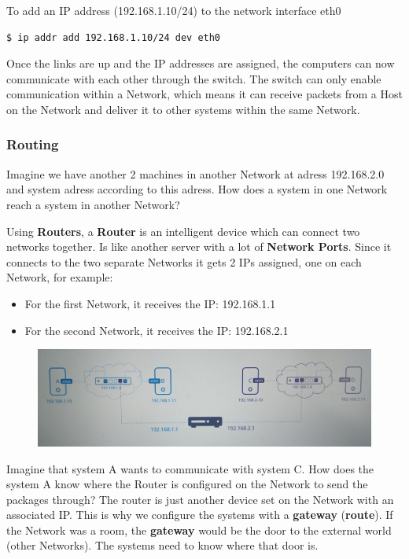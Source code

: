 \documentclass{article}
\newenvironment{codetemplate}[1][]{%
  \mybasecolorbox[#1]
  \itshape
}{%
  \endmybasecolorbox
}
\begin{document}
To add an IP address (192.168.1.10/24) to the network interface eth0
\begin{codetemplate}{}
\begin{verbatim}
$ ip addr add 192.168.1.10/24 dev eth0
\end{verbatim}
\end{codetemplate}

Once the links are up and the IP addresses are assigned, the computers can now communicate with each other through the switch. The switch can only enable communication within a Network, which means it can receive packets from a Host on the Network and deliver it to other systems within the same Network.

\subsubsection{Routing}

Imagine we have another 2 machines in another Network at adress 192.168.2.0 and system adress according to this adress. How does a system in one Network reach a system in another Network?

Using \textbf{Routers}, a \textbf{Router} is an intelligent device which can connect two networks together. Is like another server with a lot of \textbf{Network Ports}. Since it connects to the two separate Networks it gets 2 IPs assigned, one on each Network, for example:

\begin{itemize}
    \item For the first Network, it receives the IP: 192.168.1.1
    \item For the second Network, it receives the IP: 192.168.2.1
\end{itemize}

\begin{figure}[H]
    \includegraphics[width=\textwidth]{pictures/ntw4.png}
\end{figure}

Imagine that system A wants to communicate with system C. How does the system 
A know where the Router is configured on the Network to send the packages through? 
The router is just another device set on the Network with an associated IP. This is why we configure the systems with a \textbf{gateway} (\textbf{route}). If the Network was a room, the \textbf{gateway} would be the door to the external world (other Networks). The systems need to know where that door is. 
\end{document}
